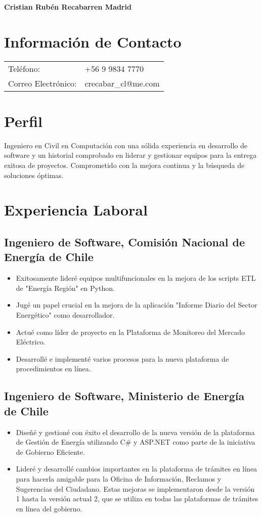 \documentclass[a4paper,10pt]{article}
\begin{document}
\begin{center}
    \textbf{\LARGE Cristian Rubén Recabarren Madrid}
\end{center}

\section*{Información de Contacto}
\begin{tabular}{p{3cm} p{10cm}}
    Teléfono: & +56 9 9834 7770 \\
    Correo Electrónico: & crecabar\_cl@me.com \\
\end{tabular}

\section*{Perfil}
Ingeniero en Civil en Computación con una sólida experiencia en desarrollo de software y un historial comprobado en liderar y gestionar equipos para la entrega exitosa de proyectos. Comprometido con la mejora continua y la búsqueda de soluciones óptimas.

\section*{Experiencia Laboral}
\subsection*{Ingeniero de Software, Comisión Nacional de Energía de Chile}
\begin{itemize}[left=0em]
    \item Exitosamente lideré equipos multifuncionales en la mejora de los scripts ETL de "Energía Región" en Python.
    \item Jugé un papel crucial en la mejora de la aplicación "Informe Diario del Sector Energético" como desarrollador.
    \item Actué como líder de proyecto en la Plataforma de Monitoreo del Mercado Eléctrico.
    \item Desarrollé e implementé varios procesos para la nueva plataforma de procedimientos en línea.
\end{itemize}

\subsection*{Ingeniero de Software, Ministerio de Energía de Chile}
\begin{itemize}[left=0em]
    \item Diseñé y gestioné con éxito el desarrollo de la nueva versión de la plataforma de Gestión de Energía utilizando C# y ASP.NET como parte de la iniciativa de Gobierno Eficiente.
    \item Lideré y desarrollé cambios importantes en la plataforma de trámites en línea para hacerla amigable para la Oficina de Información, Reclamos y Sugerencias del Ciudadano. Estas mejoras se implementaron desde la versión 1 hasta la versión actual 2, que se utiliza en todas las plataformas de trámites en línea del gobierno.
\end{itemize}
\end{document}

